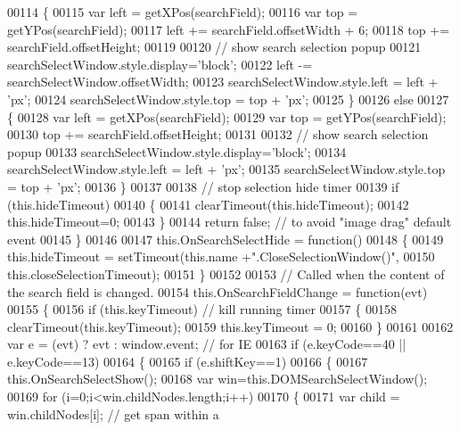 \begin{DoxyCode}
00114     \{
00115       var left = getXPos(searchField);
00116       var top  = getYPos(searchField);
00117       left += searchField.offsetWidth + 6;
00118       top += searchField.offsetHeight;
00119 
00120       \textcolor{comment}{// show search selection popup}
00121       searchSelectWindow.style.display=\textcolor{stringliteral}{'block'};
00122       left -= searchSelectWindow.offsetWidth;
00123       searchSelectWindow.style.left =  left + \textcolor{stringliteral}{'px'};
00124       searchSelectWindow.style.top  =  top  + \textcolor{stringliteral}{'px'};
00125     \}
00126     \textcolor{keywordflow}{else}
00127     \{
00128       var left = getXPos(searchField);
00129       var top  = getYPos(searchField);
00130       top += searchField.offsetHeight;
00131 
00132       \textcolor{comment}{// show search selection popup}
00133       searchSelectWindow.style.display=\textcolor{stringliteral}{'block'};
00134       searchSelectWindow.style.left =  left + \textcolor{stringliteral}{'px'};
00135       searchSelectWindow.style.top  =  top  + \textcolor{stringliteral}{'px'};
00136     \}
00137 
00138     \textcolor{comment}{// stop selection hide timer}
00139     \textcolor{keywordflow}{if} (this.hideTimeout)
00140     \{
00141       clearTimeout(this.hideTimeout);
00142       this.hideTimeout=0;
00143     \}
00144     \textcolor{keywordflow}{return} \textcolor{keyword}{false}; \textcolor{comment}{// to avoid "image drag" default event}
00145   \}
00146 
00147   this.OnSearchSelectHide = \textcolor{keyword}{function}()
00148   \{
00149     this.hideTimeout = setTimeout(this.name +\textcolor{stringliteral}{".CloseSelectionWindow()"},
00150                                   this.closeSelectionTimeout);
00151   \}
00152 
00153   \textcolor{comment}{// Called when the content of the search field is changed.}
00154   this.OnSearchFieldChange = \textcolor{keyword}{function}(evt)
00155   \{
00156     \textcolor{keywordflow}{if} (this.keyTimeout) \textcolor{comment}{// kill running timer}
00157     \{
00158       clearTimeout(this.keyTimeout);
00159       this.keyTimeout = 0;
00160     \}
00161 
00162     var e  = (evt) ? evt : window.event; \textcolor{comment}{// for IE}
00163     if (e.keyCode==40 || e.keyCode==13)
00164     \{
00165       \textcolor{keywordflow}{if} (e.shiftKey==1)
00166       \{
00167         this.OnSearchSelectShow();
00168         var win=this.DOMSearchSelectWindow();
00169         \textcolor{keywordflow}{for} (i=0;i<win.childNodes.length;i++)
00170         \{
00171           var child = win.childNodes[i]; \textcolor{comment}{// get span within a}

\end{DoxyCode}
